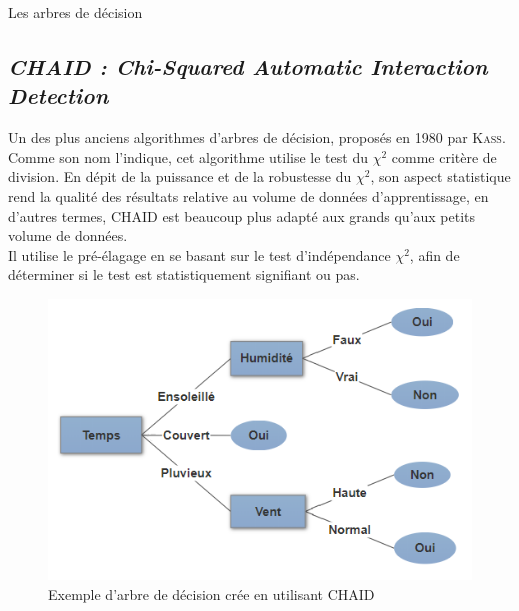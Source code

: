 \documentclass[a4paper, 11pt]{report}
\begin{document}
\begin{chapter}{Les arbres de décision}
\subsection{\emph{CHAID : Chi-Squared Automatic Interaction Detection}} 
Un des plus anciens algorithmes d'arbres de décision, proposés en 1980 par \textsc{Kass}. \\
Comme son nom l'indique, cet algorithme utilise le test du $\chi^2$ comme critère de division\cite{wilkinson1992tree}. En dépit de la puissance et de la robustesse du $\chi^2$, son aspect statistique rend la qualité des résultats relative au volume de données d'apprentissage, en d'autres termes, CHAID est beaucoup plus adapté aux grands qu'aux petits volume de données.\\
Il utilise le pré-élagage en se basant sur le test d'indépendance $\chi^2$, afin de déterminer si le test est statistiquement signifiant ou pas.
\begin{figure}[h!]
\begin{center}
\includegraphics[scale=0.55]{Images/arbre_id3}
\end{center}
\caption{Exemple d'arbre de décision crée en utilisant CHAID}
\end{figure}

\end{chapter}
\end{document}
